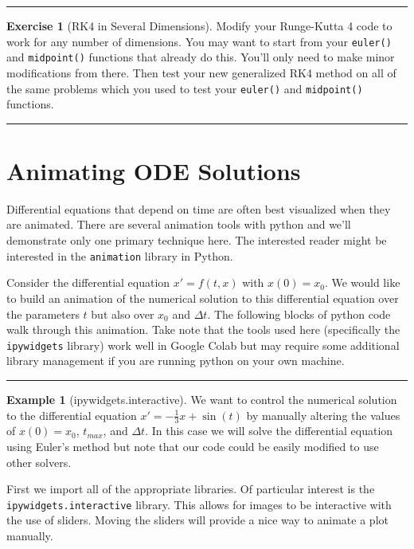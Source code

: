 \documentclass[
]{book}
\theoremstyle{definition}
\theoremstyle{definition}
\newtheorem{example}{Example}[chapter]
\theoremstyle{definition}
\newtheorem{exercise}{Exercise}[chapter]
\theoremstyle{remark}
\begin{document}
\begin{center}\rule{0.5\linewidth}{0.5pt}\end{center}

\begin{exercise}[RK4 in Several Dimensions]
\protect\hypertarget{exr:unnamed-chunk-462}{}{\label{exr:unnamed-chunk-462} {} }Modify your Runge-Kutta 4 code to work for any number of dimensions. You may want to start from your \texttt{euler()} and \texttt{midpoint()} functions that already do this. You'll only need to make minor modifications from there. Then test your new generalized RK4 method on all of the same problems which you used to test your \texttt{euler()} and \texttt{midpoint()} functions.
\end{exercise}

\begin{center}\rule{0.5\linewidth}{0.5pt}\end{center}

\hypertarget{animating-ode-solutions}{%
\section{Animating ODE Solutions}\label{animating-ode-solutions}}

Differential equations that depend on time are often best visualized when they are animated. There are several animation tools with python and we'll demonstrate only one primary technique here. The interested reader might be interested in the \texttt{animation} library in Python.

Consider the differential equation \(x' = f(t,x)\) with \(x(0) = x_0\). We would like to build an animation of the numerical solution to this differential equation over the parameters \(t\) but also over \(x_0\) and \(\Delta t\). The following blocks of python code walk through this animation. Take note that the tools used here (specifically the \texttt{ipywidgets} library) work well in Google Colab but may require some additional library management if you are running python on your own machine.

\begin{center}\rule{0.5\linewidth}{0.5pt}\end{center}

\begin{example}[ipywidgets.interactive]
\protect\hypertarget{exm:unnamed-chunk-463}{}{\label{exm:unnamed-chunk-463} {} }We want to control the numerical solution to the differential equation \(x' = -\frac{1}{3}x + \sin(t)\) by manually altering the values of \(x(0) = x_0\), \(t_{max}\), and \(\Delta t\). In this case we will solve the differential equation using Euler's method but note that our code could be easily modified to use other solvers.

First we import all of the appropriate libraries. Of particular interest is the \texttt{ipywidgets.interactive} library. This allows for images to be interactive with the use of sliders. Moving the sliders will provide a nice way to animate a plot manually.
\end{example}
\end{document}
